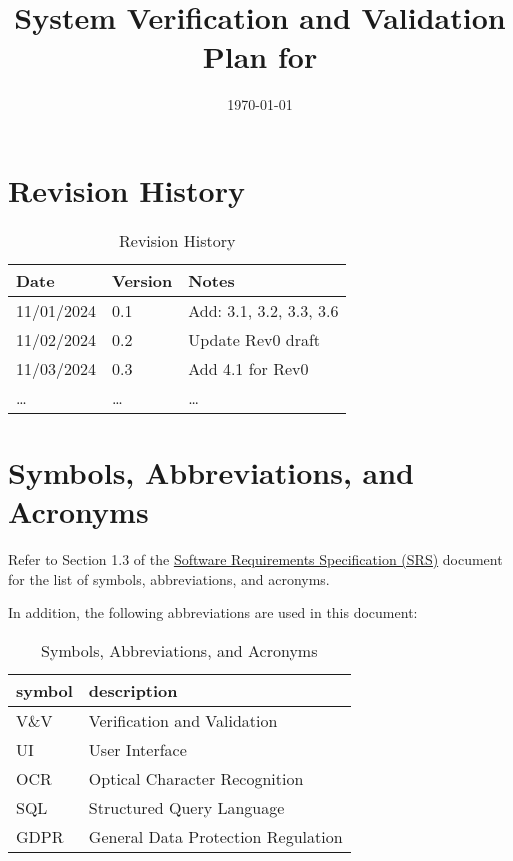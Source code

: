 \documentclass[12pt, titlepage]{article}
\begin{document}
\title{System Verification and Validation Plan for \progname{}} 
\author{\authname}
\date{\today}
	
\maketitle


\section*{Revision History}

\begin{table}[h!]
\caption{Revision History}
\begin{tabularx}{\textwidth}{p{3cm}p{2cm}X}
\toprule {\bf Date} & {\bf Version} & {\bf Notes}\\
\midrule
11/01/2024 & 0.1 & Add: 3.1, 3.2, 3.3, 3.6\\
11/02/2024 & 0.2 & Update Rev0 draft\\
11/03/2024 & 0.3 & Add 4.1 for Rev0\\
\ldots & \ldots & \ldots\\
\bottomrule
\end{tabularx}
\end{table}

\newpage

\tableofcontents

\newpage

\section{Symbols, Abbreviations, and Acronyms}

Refer to Section 1.3 of the
\href{https://github.com/PlutosCapstone/Plutos/blob/main/docs/SRS/SRS.pdf}{Software
Requirements Specification (SRS)} document for the list of symbols,
abbreviations, and acronyms.

In addition, the following abbreviations are used in this document:\\

\renewcommand{\arraystretch}{1.2}
\begin{table}[h!]
\caption{Symbols, Abbreviations, and Acronyms}
\begin{tabularx}{\textwidth}{l l}
  \toprule		
  \textbf{symbol} & \textbf{description}\\
  \midrule 
  V\&V & Verification and Validation\\
  UI & User Interface\\
  OCR & Optical Character Recognition\\
  SQL & Structured Query Language\\
  GDPR & General Data Protection Regulation\\
  \bottomrule
\end{tabularx}
\end{table}
\end{document}
